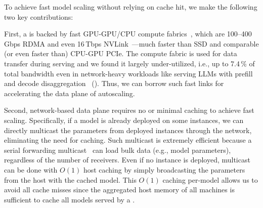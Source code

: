 To achieve fast model scaling without relying on cache hit,
we make the following two key contributions:

First, a {\maas} is backed by fast GPU-GPU/CPU compute fabrics~\cite{nvidia-compute-network},
which are 100--400\,Gbps RDMA and even 16\,Tbps NVLink~\cite{googleinstance,awsinstance,volcanoinstance}---much
faster than SSD and comparable (or even faster than) CPU-GPU PCIe.
The compute fabric is used for data transfer during serving
and we found it largely under-utilized,
i.e., up to 7.4\,\% of total bandwidth
even in network-heavy workloads like serving LLMs with prefill and decode disaggregation~\cite{DBLP:conf/isca/PatelCZSGMB24, DBLP:conf/osdi/ZhongLCHZL0024,DBLP:journals/corr/abs-2401-11181,DBLP:conf/ppopp/CaiLMMMNS21,DBLP:journals/corr/abs-2404-09526} (\textsection{\ref{sec:bg-motiv}}).
Thus, we can borrow such fast links for accelerating the data plane of autoscaling.

Second, network-based data plane requires no or minimal caching to achieve fast scaling. 
Specifically,
if a model is already deployed on some instances,
we can directly multicast the parameters from deployed instances through the network, 
eliminating the need for caching.
Such multicast is extremely efficient
because a serial forwarding multicast~\cite{DBLP:conf/icpp/VerstoepLB96}
can load bulk data (e.g., model parameters), regardless of the number of receivers. 
Even if no instance is deployed, multicast can be done with $O(1)$ host caching by
simply broadcasting the parameters from the host with the cached model. 
This $O(1)$ caching per-model allows us to avoid all cache misses
since the aggregated host memory of all machines is sufficient to cache all models served by a {\maas}. 

